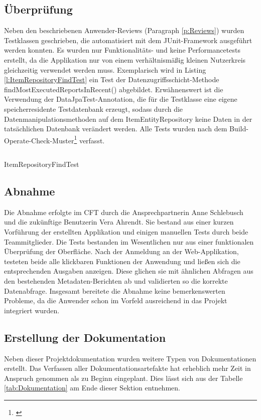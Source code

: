 \subsection{Überprüfung}
\label{sec:Ueberpruefung}
Neben den beschriebenen Anwender-Reviews (Paragraph \ref{p:Reviews}) wurden Testklassen geschrieben, die automatisiert mit dem JUnit-Framework ausgeführt werden konnten. Es wurden nur Funktionalitäts- und keine Performancetests erstellt, da die Applikation nur von einem verhältnismäßig kleinen Nutzerkreis gleichzeitig verwendet werden muss. Exemplarisch wird in Listing \ref{l:ItemRepositoryFindTest} ein Test der Datenzugriffsschicht-Methode findMostExecutedReportsInRecent() abgebildet. Erwähnenswert ist die Verwendung der DataJpaTest-Annotation, die für die Testklasse eine eigene speicherresidente Testdatenbank erzeugt, sodass durch die Datenmanipulationsmethoden auf dem ItemEntityRepository keine Daten in der tatsächlichen Datenbank verändert werden. Alle Tests wurden nach dem Build-Operate-Check-Muster\footnote{\cite{fitnesse:boc}} verfasst.
\begin{listing}[!ht]
  \inputminted{java}{Listings/ItemRepositoryFindTest.java}
  \caption{ItemRepositoryFindTest}
  \label{l:ItemRepositoryFindTest}
\end{listing}
\clearpage
\subsection{Abnahme}
\label{sec:Abnahme}
Die Abnahme erfolgte im \ac{CFT} \teamName durch die Ansprechpartnerin Anne Schlebusch und die zukünftige Benutzerin Vera Ahrendt. Sie bestand aus einer kurzen Vorführung der erstellten Applikation und einigen manuellen Tests durch beide Teammitglieder. Die Tests bestanden im Wesentlichen nur aus einer funktionalen Überprüfung der Oberfläche. Nach der Anmeldung an der Web-Applikation, testeten beide alle klickbaren Funktionen der Anwendung und ließen sich die entsprechenden Ausgaben anzeigen. Diese glichen sie mit ähnlichen Abfragen aus den bestehenden Metadaten-Berichten ab und validierten so die korrekte Datenabfrage. Insgesamt bereitete die Abnahme keine bemerkenswerten Probleme, da die Anwender schon im Vorfeld ausreichend in das Projekt integriert wurden.

\subsection{Erstellung der Dokumentation}
\label{sec:Dokumentation}
Neben dieser Projektdokumentation wurden weitere Typen von Dokumentationen erstellt. Das Verfassen aller Dokumentationsartefakte hat erheblich mehr Zeit in Anspruch genommen als zu Beginn eingeplant. Dies lässt sich aus der Tabelle \ref{tab:Dokumentation} am Ende dieser Sektion entnehmen.

